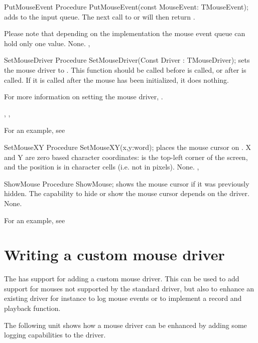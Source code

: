 \begin{procedure}{PutMouseEvent}
\Declaration
Procedure PutMouseEvent(const MouseEvent: TMouseEvent);
\Description
{} adds  to the input queue. The next
call to  or  will then return
. 

Please note that depending on the implementation the mouse event queue
can hold only one value.
\Errors
None.
\SeeAlso
{}, 
\end{procedure}

\begin{procedure}{SetMouseDriver}
\Declaration
Procedure SetMouseDriver(Const Driver : TMouseDriver);
\Description
{} sets the mouse driver to . This function
should be called before  is called, or after 
is called. If it is called after the mouse has been initialized, it does
nothing.

For more information on setting the mouse driver, .
\Errors

\SeeAlso
{}, , 
\end{procedure}

For an example, see 

\begin{procedure}{SetMouseXY}
\Declaration
Procedure SetMouseXY(x,y:word); 
\Description
{} places the mouse cursor on . X and Y are zero
based character coordinates:  is the top-left corner of the screen,
and the position is in character cells (i.e. not in pixels).
\Errors
None.
\SeeAlso
{}, 
\end{procedure}


\begin{procedure}{ShowMouse}
\Declaration
Procedure ShowMouse; 
\Description
{} shows the mouse cursor if it was previously hidden. The
capability to hide or show the mouse cursor depends on the driver.
\Errors
None.
\SeeAlso
{}
\end{procedure}

For an example, see 

\section{Writing a custom mouse driver}
\label{se:mousedrv}
The  has support for adding a custom mouse driver. This can be
used to add support for mouses not supported by the standard \fpc{} driver,
but also to enhance an existing driver for instance to log mouse events or
to implement a record and playback function. 

The following unit shows how a mouse driver can be enhanced by adding some
logging capabilities to the driver.
